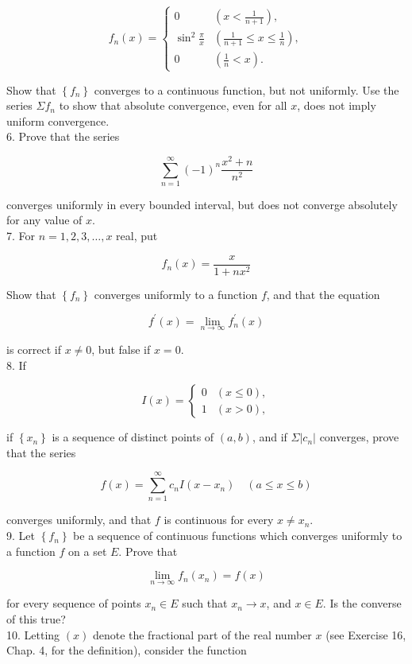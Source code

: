 \documentclass[10pt]{article}
\begin{document}
$$
f_{n}(x)= \begin{cases}0 & \left(x<\frac{1}{n+1}\right), \\ \sin ^{2} \frac{\pi}{x} & \left(\frac{1}{n+1} \leq x \leq \frac{1}{n}\right), \\ 0 & \left(\frac{1}{n}<x\right) .\end{cases}
$$

Show that $\left\{f_{n}\right\}$ converges to a continuous function, but not uniformly. Use the series $\Sigma f_{n}$ to show that absolute convergence, even for all $x$, does not imply uniform convergence.\\
6. Prove that the series

$$
\sum_{n=1}^{\infty}(-1)^{n} \frac{x^{2}+n}{n^{2}}
$$

converges uniformly in every bounded interval, but does not converge absolutely for any value of $x$.\\
7. For $n=1,2,3, \ldots, x$ real, put

$$
f_{n}(x)=\frac{x}{1+n x^{2}}
$$

Show that $\left\{f_{n}\right\}$ converges uniformly to a function $f$, and that the equation

$$
f^{\prime}(x)=\lim _{n \rightarrow \infty} f_{n}^{\prime}(x)
$$

is correct if $x \neq 0$, but false if $x=0$.\\
8. If

$$
I(x)= \begin{cases}0 & (x \leq 0), \\ 1 & (x>0),\end{cases}
$$

if $\left\{x_{n}\right\}$ is a sequence of distinct points of $(a, b)$, and if $\Sigma\left|c_{n}\right|$ converges, prove that the series

$$
f(x)=\sum_{n=1}^{\infty} c_{n} I\left(x-x_{n}\right) \quad(a \leq x \leq b)
$$

converges uniformly, and that $f$ is continuous for every $x \neq x_{n}$.\\
9. Let $\left\{f_{n}\right\}$ be a sequence of continuous functions which converges uniformly to a function $f$ on a set $E$. Prove that

$$
\lim _{n \rightarrow \infty} f_{n}\left(x_{n}\right)=f(x)
$$

for every sequence of points $x_{n} \in E$ such that $x_{n} \rightarrow x$, and $x \in E$. Is the converse of this true?\\
10. Letting $(x)$ denote the fractional part of the real number $x$ (see Exercise 16, Chap. 4, for the definition), consider the function
\end{document}

